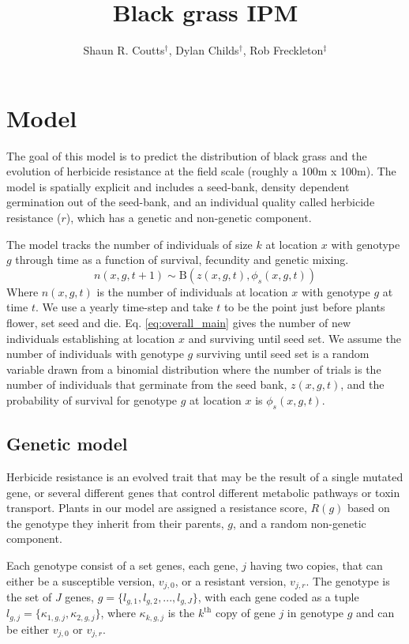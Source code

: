 \documentclass[12pt, a4paper]{article}
\begin{document}
\title{Black grass IPM}
\author{Shaun R. Coutts$^\dag$, Dylan Childs$^\dag$, Rob Freckleton$^\ddag$}
\maketitle

\section{Model}
The goal of this model is to predict the distribution of black grass and the evolution of herbicide resistance at the field scale (roughly a 100m x 100m). The model is spatially explicit and includes a seed-bank, density dependent germination out of the seed-bank, and an individual quality called herbicide resistance ($r$), which has a genetic and non-genetic component. 

The model tracks the number of individuals of size $k$ at location $x$ with genotype $g$ through time as a function of survival, fecundity and genetic mixing.
\begin{equation}
	\label{eq:overall_main}
	n(x, g, t + 1) \sim \text{B}(z(x, g, t), \phi_s(x, g, t))	 
\end{equation}
Where $n(x, g, t)$ is the number of individuals at location $x$ with genotype $g$ at time $t$. We use a yearly time-step and take $t$ to be the point just before plants flower, set seed and die. Eq. \ref{eq:overall_main} gives the number of new individuals establishing at location $x$ and surviving until seed set. We assume the number of individuals with genotype $g$ surviving until seed set is a random variable drawn from a binomial distribution where the number of trials is the number of individuals that germinate from the seed bank, $z(x, g, t)$, and the probability of survival for genotype $g$ at location $x$ is $\phi_s(x, g, t)$.  

\subsection*{Genetic model}
Herbicide resistance is an evolved trait that may be the result of a single mutated gene, or several different genes that control different metabolic pathways or toxin transport. Plants in our model are assigned a resistance score, $R(g)$ based on the genotype they inherit from their parents, $g$, and a random non-genetic component. 

Each genotype consist of a set genes, each gene, $j$ having two copies, that can either be a susceptible version, $v_{j,0}$, or a resistant version, $v_{j,r}$. The genotype is the set of $J$ genes, $g = \{l_{g,1}, l_{g,2}, ..., l_{g,J}\}$, with each gene coded as a tuple $l_{g,j} = \{\kappa_{1,g,j}, \kappa_{2,g,j}\}$, where $\kappa_{k,g,j}$ is the $k^{\text{th}}$ copy of gene $j$ in genotype $g$ and can be either $v_{j,0}$ or $v_{j,r}$.  
\end{document}
